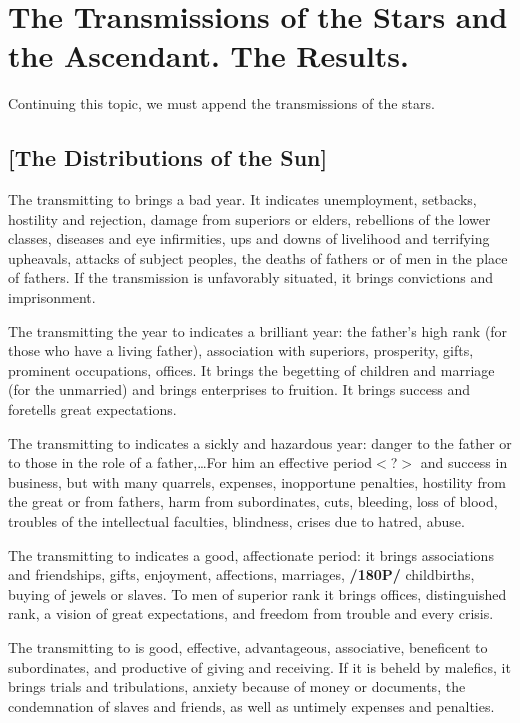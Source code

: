 \section{The Transmissions of the Stars and the Ascendant. The Results.}

Continuing this topic, we must append the transmissions of the stars.

\subsection{[The Distributions of the Sun]}
The \Sun\xspace transmitting to \Saturn\xspace brings a bad year. It indicates unemployment, setbacks, hostility and
rejection, damage from superiors or elders, rebellions of the lower classes, diseases and eye infirmities, ups and downs of livelihood and terrifying upheavals, attacks of subject peoples, the deaths of fathers or of men in the place of fathers. If the transmission is unfavorably situated, it brings convictions and imprisonment.

The \Sun\xspace transmitting the year to \Jupiter\xspace indicates a brilliant year: the father’s high rank (for those who have a living father), association with superiors, prosperity, gifts, prominent occupations, offices. It brings
the begetting of children and marriage (for the unmarried) and brings enterprises to fruition. It brings success and foretells great expectations.

The \Sun\xspace transmitting to \Mars\xspace indicates a sickly and hazardous year: danger to the father or to those in
the role of a father,\ldots For him an effective period$<$?$>$ and success in business, but with many quarrels, expenses, inopportune penalties, hostility from the great or from fathers, harm from subordinates, cuts, bleeding, loss of blood, troubles of the intellectual faculties, blindness, crises due to hatred, abuse.

The \Sun\xspace transmitting to \Venus\xspace indicates a good, affectionate period: it brings associations and friendships, gifts, enjoyment, affections, marriages, \textbf{/180P/} childbirths, buying of jewels or slaves. To men of superior rank it brings offices, distinguished rank, a vision of great expectations, and freedom from trouble and every crisis.

The \Sun\xspace transmitting to \Mercury\xspace is good, effective, advantageous, associative, beneficent to subordinates, and productive of giving and receiving. If it is beheld by malefics, it brings trials and tribulations, anxiety because of money or documents, the condemnation of slaves and friends, as well as untimely expenses and penalties.

